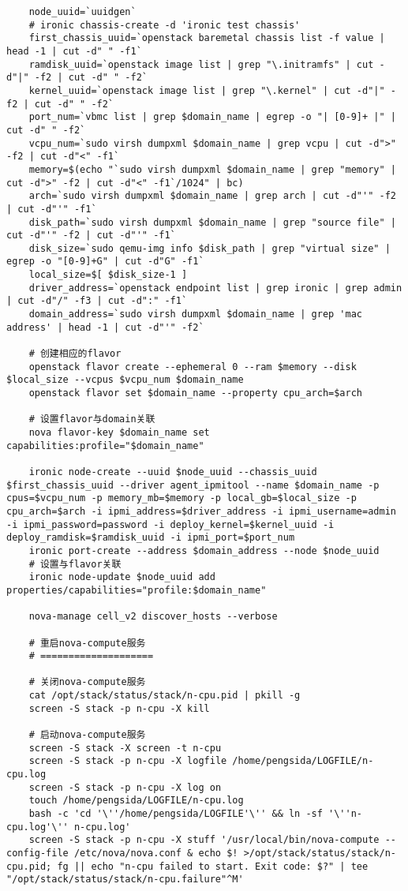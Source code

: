 \documentclass[a4paper,left=1.5cm,right=1.5cm,11pt]{article}
\begin{document}
\begin{lstlisting}
	node_uuid=`uuidgen`
	# ironic chassis-create -d 'ironic test chassis'
	first_chassis_uuid=`openstack baremetal chassis list -f value | head -1 | cut -d" " -f1`
	ramdisk_uuid=`openstack image list | grep "\.initramfs" | cut -d"|" -f2 | cut -d" " -f2`
	kernel_uuid=`openstack image list | grep "\.kernel" | cut -d"|" -f2 | cut -d" " -f2`
	port_num=`vbmc list | grep $domain_name | egrep -o "| [0-9]+ |" | cut -d" " -f2`
	vcpu_num=`sudo virsh dumpxml $domain_name | grep vcpu | cut -d">" -f2 | cut -d"<" -f1`
	memory=$(echo "`sudo virsh dumpxml $domain_name | grep "memory" | cut -d">" -f2 | cut -d"<" -f1`/1024" | bc)
	arch=`sudo virsh dumpxml $domain_name | grep arch | cut -d"'" -f2 | cut -d"'" -f1`
	disk_path=`sudo virsh dumpxml $domain_name | grep "source file" | cut -d"'" -f2 | cut -d"'" -f1`
	disk_size=`sudo qemu-img info $disk_path | grep "virtual size" | egrep -o "[0-9]+G" | cut -d"G" -f1`
	local_size=$[ $disk_size-1 ]
	driver_address=`openstack endpoint list | grep ironic | grep admin | cut -d"/" -f3 | cut -d":" -f1`
	domain_address=`sudo virsh dumpxml $domain_name | grep 'mac address' | head -1 | cut -d"'" -f2`

	# 创建相应的flavor
	openstack flavor create --ephemeral 0 --ram $memory --disk $local_size --vcpus $vcpu_num $domain_name
	openstack flavor set $domain_name --property cpu_arch=$arch

	# 设置flavor与domain关联
	nova flavor-key $domain_name set capabilities:profile="$domain_name"

	ironic node-create --uuid $node_uuid --chassis_uuid $first_chassis_uuid --driver agent_ipmitool --name $domain_name -p cpus=$vcpu_num -p memory_mb=$memory -p local_gb=$local_size -p cpu_arch=$arch -i ipmi_address=$driver_address -i ipmi_username=admin -i ipmi_password=password -i deploy_kernel=$kernel_uuid -i deploy_ramdisk=$ramdisk_uuid -i ipmi_port=$port_num
	ironic port-create --address $domain_address --node $node_uuid
	# 设置与flavor关联
	ironic node-update $node_uuid add properties/capabilities="profile:$domain_name"

	nova-manage cell_v2 discover_hosts --verbose

	# 重启nova-compute服务
	# ====================

	# 关闭nova-compute服务
	cat /opt/stack/status/stack/n-cpu.pid | pkill -g
	screen -S stack -p n-cpu -X kill

	# 启动nova-compute服务
	screen -S stack -X screen -t n-cpu
	screen -S stack -p n-cpu -X logfile /home/pengsida/LOGFILE/n-cpu.log
    screen -S stack -p n-cpu -X log on
	touch /home/pengsida/LOGFILE/n-cpu.log
    bash -c 'cd '\''/home/pengsida/LOGFILE'\'' && ln -sf '\''n-cpu.log'\'' n-cpu.log'
	screen -S stack -p n-cpu -X stuff '/usr/local/bin/nova-compute --config-file /etc/nova/nova.conf & echo $! >/opt/stack/status/stack/n-cpu.pid; fg || echo "n-cpu failed to start. Exit code: $?" | tee "/opt/stack/status/stack/n-cpu.failure"^M'


\end{lstlisting}
\end{document}
